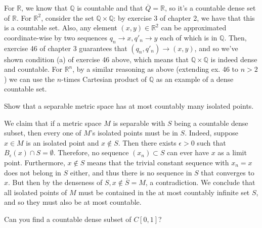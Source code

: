 \begin{solution}
    
    For $\mathbb{R}$, we know that $\mathbb{Q}$ is countable and that $\overline{Q} = \mathbb{R}$, so it's a countable dense set of $\mathbb{R}$.
    For $\mathbb{R}^2$, consider the set $\mathbb{Q} \times \mathbb{Q}$: by exercise 3 of chapter 2, we have that this is a countable set.
    Also, any element $(x, y) \in \mathbb{R}^2$ can be approximated coordinate-wise by two sequences $q_n \rightarrow x, q'_n \rightarrow y$ each of which is in $\mathbb{Q}$.
    Then, exercise 46 of chapter 3 guarantees that $(q_n, q'_n) \rightarrow (x, y)$, and so we've shown condition (a) of exercise 46 above, which means that $\mathbb{Q} \times \mathbb{Q}$ is indeed dense and countable.
    For $\mathbb{R}^n$, by a similar reasoning as above (extending ex. 46 to $n > 2$) we can use the $n$-times Cartesian product of $\mathbb{Q}$ as an example of a dense countable set.
\end{solution}

\begin{exercise}{51}
    Show that a separable metric space has at most countably many isolated points.
\end{exercise}

\begin{solution}
    
    We claim that if a metric space $M$ is separable with $S$ being a countable dense subset, then every one of $M$'s isolated points must be in $S$.
    Indeed, suppose $x \in M$ is an isolated point and $x \notin S$.
    Then there exists $\epsilon > 0$ such that $B_{\epsilon}(x) \cap S = \emptyset$.
    Therefore, no sequence $(x_n) \subset S$ can ever have $x$ as a limit point.
    Furthermore, $x \notin S$ means that the trivial constant sequence with $x_n = x$ does not belong in $S$ either, and thus there is no sequence in $S$ that converges to $x$.
    But then by the denseness of $S, x \notin \overline{S} = M$, a contradiction.
    We conclude that all isolated points of $M$ must be contained in the at most countably infinite set $S$, and so they must also be at most countable.
\end{solution}

\begin{exercise}{53}
    Can you find a countable dense subset of $C[0, 1]$?
\end{exercise}

\begin{solution}
    
    
\end{solution}
